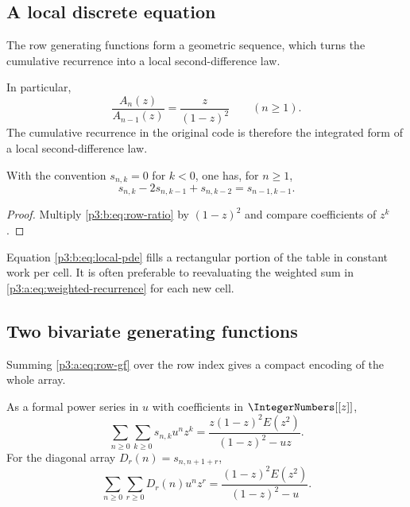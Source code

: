 \documentclass[11pt,oneside]{article}
\numberwithin{equation}{section}
\theoremstyle{definition}
\theoremstyle{remark}
\begin{document}
\subsection{A local discrete equation}
The row generating functions form a geometric sequence, which turns the
cumulative recurrence into a local second-difference law.

In particular,
\begin{equation}
 \frac{A_n(z)}{A_{n-1}(z)}=\frac{z}{(1-z)^2}
 \qquad(n\ge1).
 \label{p3:b:eq:row-ratio}
\end{equation}
The cumulative recurrence in the original code is therefore the integrated
form of a local second-difference law.

\begin{corollary}
\label{p3:b:cor:local-pde}
With the convention $s_{n,k}=0$ for $k<0$, one has, for $n\ge1$,
\begin{equation}
 s_{n,k}-2s_{n,k-1}+s_{n,k-2}=s_{n-1,k-1}.
 \label{p3:b:eq:local-pde}
\end{equation}
\end{corollary}

\begin{proof}
Multiply \eqref{p3:b:eq:row-ratio} by $(1-z)^2$ and compare coefficients of
$z^k$.
\end{proof}

Equation \eqref{p3:b:eq:local-pde} fills a rectangular portion of the table in
constant work per cell.  It is often preferable to reevaluating the weighted
sum in \eqref{p3:a:eq:weighted-recurrence} for each new cell.
\subsection{Two bivariate generating functions}

Summing \eqref{p3:a:eq:row-gf} over the row index gives a compact encoding of the
whole array.

\begin{proposition}
As a formal power series in \(u\) with coefficients in \(\IntegerNumbers[[z]]\),
\begin{equation}
 \boxed{
 \sum_{n\ge0}\sum_{k\ge0}s_{n,k}u^nz^k
 =\frac{z(1-z)^2E(z^2)}{(1-z)^2-uz}.}
 \label{p3:a:eq:bivariate-table}
\end{equation}
For the diagonal array \(D_r(n)=s_{n,n+1+r}\),
\begin{equation}
 \boxed{
 \sum_{n\ge0}\sum_{r\ge0}D_r(n)u^nz^r
 =\frac{(1-z)^2E(z^2)}{(1-z)^2-u}.}
 \label{p3:a:eq:bivariate-diagonal}
\end{equation}
\end{proposition}
\end{document}

